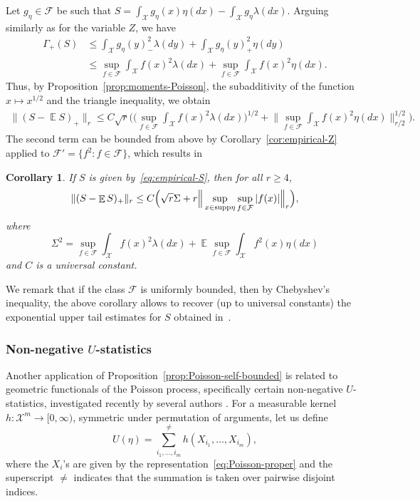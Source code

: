 \documentclass[a4paper]{amsart}
\newtheorem{corollary}[theorem]{Corollary} %
\theoremstyle{definition}
\theoremstyle{remark}
\numberwithin{equation}{section}
\DeclareMathOperator{\EE}{\mathbb{E}} %
\begin{document}
Let $g_\eta \in \mathcal{F}$ be such that $S = \int_\mathcal{X} g_\eta(x)\eta(dx) - \int_\mathcal{X} g_\eta \lambda(dx)$.
Arguing similarly as for the variable $Z$, we have
\begin{align*}
\Gamma_+(S) & \le \int_\mathcal{X} g_\eta(y)_-^2 \lambda(dy) + \int_\mathcal{X} g_\eta(y)_+^2 \eta(dy)\\
& \le \sup_{f\in \mathcal{F}} \int_\mathcal{X} f(x)^2 \lambda(dx) + \sup_{f\in \mathcal{F}} \int_\mathcal{X} f(x)^2 \eta(dx).
\end{align*}
Thus, by Proposition~\ref{prop:moments-Poisson}, the subadditivity  of the function $x\mapsto x^{1/2}$ and the triangle inequality, we obtain
\begin{align*}
\|(S-\EE S)_+\|_r \le C\sqrt{r} \Big(\Big(\sup_{f\in \mathcal{F}} \int_\mathcal{X} f(x)^2 \lambda(dx)\Big)^{1/2} + \Big\|\sup_{f\in \mathcal{F}} \int_\mathcal{X} f(x)^2 \eta(dx)\Big\|_{r/2}^{1/2}\Big).
\end{align*}
The second term can be bounded from above by Corollary~\ref{cor:empirical-Z} applied to $\mathcal{F}' = \{f^2\colon f\in\mathcal{F}\}$, which results in


\begin{corollary}
If $S$ is given by~\eqref{eq:empirical-S}, then for all $r \ge 4$,
\begin{displaymath}
\|(S - \EE S)_+\|_r \le C\Big(\sqrt{r}\Sigma + r \Big\|\sup_{x\in{\rm supp \eta}}\sup_{f\in \mathcal{F}} |f(x)|\Big\|_r\Big),
\end{displaymath}
where
\begin{displaymath}
  \Sigma^2 = \sup_{f\in \mathcal{F}} \int_\mathcal{X} f(x)^2 \lambda(dx) + \EE \sup_{f\in\mathcal{F}} \int_\mathcal{X} f^2(x)\eta(dx)
\end{displaymath}
and $C$ is a universal constant.
\end{corollary}

We remark that if the class $\mathcal{F}$ is uniformly bounded, then by Chebyshev's inequality, the above corollary allows to recover (up to universal constants) the exponential upper tail estimates for $S$ obtained in~\cite{MR1981635}.



\subsubsection{Non-negative $U$-statistics}
Another application of Proposition~\ref{prop:Poisson-self-bounded} is related to geometric functionals of the Poisson process, specifically certain non-negative $U$-statistics, investigated recently by several authors \cite{MR3473096,MR3485348,MR3849811,gozlan2020transport}. For a measurable kernel $h\colon \mathcal{X}^m\to [0,\infty)$, symmetric under permutation of arguments, let us define
 \begin{displaymath}
   U(\eta) = \sum_{i_1,\ldots,i_m}^{\neq} h(X_{i_1},\ldots,X_{i_m}),
 \end{displaymath}
where the $X_i$'s are given by the representation~\eqref{eq:Poisson-proper} and the superscript $\neq$ indicates that the summation is taken over pairwise disjoint indices.
\end{document}
